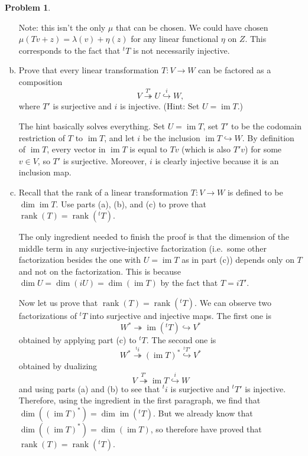 \documentclass[11pt,oneside]{amsart}
\theoremstyle{definition}
\newtheorem{problem}{Problem}
\DeclareMathOperator{\im}{im}
\DeclareMathOperator{\rank}{rank}
\begin{document}
\begin{problem}
\begin{enumerate}[(a)]
\begin{solution}
                Note: this isn't the only $\mu$ that can be chosen. We could have chosen $\mu(Tv+z)=\lambda(v)+\eta(z)$ for any linear functional $\eta$ on $Z$. This corresponds to the fact that $^tT$ is not necessarily injective.
            \end{solution}
            \item Prove that every linear transformation $T\colon V\to W$ can be factored as a composition
            \[V\overset{T'}{\twoheadrightarrow} U\overset{i}{\hookrightarrow}W,\]
            where $T'$ is surjective and $i$ is injective. (Hint: Set $U=\im T$.)
            \begin{solution}
                The hint basically solves everything. Set $U=\im T$, set $T'$ to be the codomain restriction of $T$ to $\im T$, and let $i$ be the inclusion $\im T\hookrightarrow W$. By definition of $\im T$, every vector in $\im T$ is equal to $Tv$ (which is also $T'v$) for some $v\in V$, so $T'$ is surjective. Moreover, $i$ is clearly injective because it is an inclusion map.
            \end{solution}
            \item Recall that the rank of a linear transformation $T\colon V\to W$ is defined to be $\dim\im T$. Use parts (a), (b), and (c) to prove that $\rank(T)=\rank(^tT)$.
            \begin{solution}
                The only ingredient needed to finish the proof is that the dimension of the middle term in any surjective-injective factorization (i.e.\ some other factorization besides the one with $U=\im T$ as in part (c)) depends only on $T$ and not on the factorization. This is because $\dim U=\dim(iU)=\dim(\im T)$ by the fact that $T=iT'$.

                Now let us prove that $\rank(T)=\rank(^tT)$. We can observe two factorizations of $^tT$ into surjective and injective maps. The first one is
                \[W^*\twoheadrightarrow \im(^tT)\hookrightarrow V^*\]
                obtained by applying part (c) to $^tT$. The second one is
                \[W^*\overset{^ti}\twoheadrightarrow (\im T)^*\overset{^tT'}\hookrightarrow V^*\]
                obtained by dualizing
                \[V\overset{T'}{\twoheadrightarrow} \im T\overset{i}{\hookrightarrow}W\]
                and using parts (a) and (b) to see that $^ti$ is surjective and $^tT'$ is injective. Therefore, using the ingredient in the first paragraph, we find that $\dim ((\im T)^*)=\dim \im(^tT)$. But we already know that $\dim((\im T)^*)=\dim(\im T)$, so therefore have proved that $\rank(T)=\rank(^tT)$.
            \end{solution}
        \end{enumerate}
    \end{problem}
\end{document}
